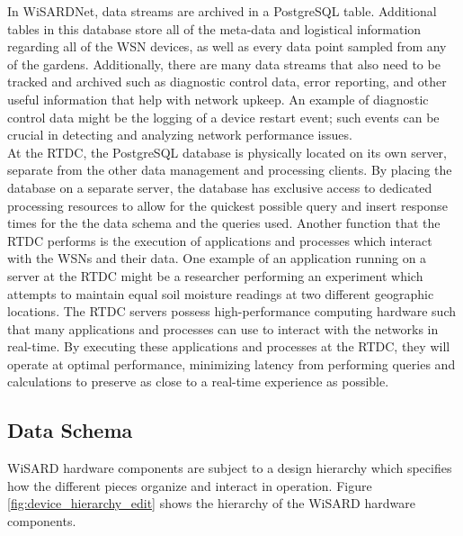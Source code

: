 In WiSARDNet, data streams are archived in a PostgreSQL table. Additional tables in this database store all of the meta-data and logistical information regarding all of the WSN devices, as well as every data point sampled from any of the gardens. Additionally, there are many data streams that also need to be tracked and archived such as diagnostic control data, error reporting, and other useful information that help with network upkeep. An example of diagnostic control data might be the logging of a device restart event; such events can be crucial in detecting and analyzing network performance issues.\\

At the RTDC, the PostgreSQL database is physically located on its own server, separate from the other data management and processing clients. By placing the database on a separate server, the database has exclusive access to dedicated processing resources to allow for the quickest possible query and insert response times for the the data schema and the queries used. Another function that the RTDC performs is the execution of applications and processes which interact with the WSNs and their data. One example of an application running on a server at the RTDC might be a researcher performing an experiment which attempts to maintain equal soil moisture readings at two different geographic locations. The RTDC servers possess high-performance computing hardware such that many applications and processes can use to interact  with the networks in real-time. By executing these applications and processes at the RTDC, they will operate at optimal performance, minimizing latency from performing queries and calculations to preserve as close to a real-time experience as possible.

\subsection{Data Schema}
WiSARD hardware components are subject to a design hierarchy which specifies how the different pieces organize and interact in operation. Figure \ref{fig:device_hierarchy_edit} shows the hierarchy of the WiSARD hardware components. 

